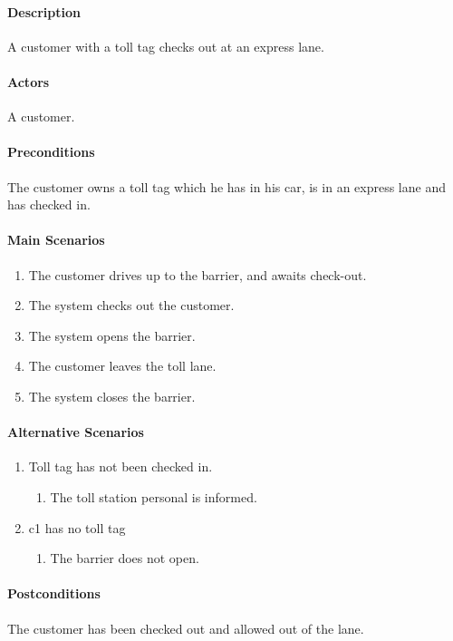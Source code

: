 \paragraph{Description }

A customer with a toll tag checks out at an express lane.


\paragraph{Actors}

A customer.


\paragraph{Preconditions}

The customer owns a toll tag which he has in his car, is in an express
lane and has checked in.


\paragraph{Main Scenarios}
\begin{enumerate}
\item The customer drives up to the barrier, and awaits check-out.
\item The system checks out the customer.
\item The system opens the barrier.
\item The customer leaves the toll lane.
\item The system closes the barrier.
\end{enumerate}

\paragraph{Alternative Scenarios}
\begin{enumerate}
\item Toll tag has not been checked in.

\begin{enumerate}
\item The toll station personal is informed.
\end{enumerate}
\item c1 has no toll tag

\begin{enumerate}
\item The barrier does not open.
\end{enumerate}
\end{enumerate}

\paragraph{Postconditions}

The customer has been checked out and allowed out of the lane.

